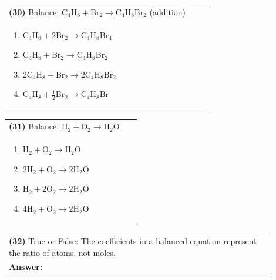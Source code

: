\documentclass{article}
\begin{document}
{\vspace{0.2cm}
\noindent \begin{tabular}{|p{0.9\linewidth}|}
\hline
\vspace{0.2cm}
\textbf{(30)} Balance: \(\mathrm{C_4H_8 + Br_2 \rightarrow C_4H_8Br_2}\) (addition)\\
\begin{minipage}[t]{0.85\linewidth}
\begin{enumerate}[label=\alph*.]
   \item \(\mathrm{C_4H_8 + 2Br_2 \rightarrow C_4H_8Br_4}\)
   \item \(\mathrm{C_4H_8 + Br_2 \rightarrow C_4H_8Br_2}\)
   \item \(\mathrm{2C_4H_8 + Br_2 \rightarrow 2C_4H_8Br_2}\)
   \item \(\mathrm{C_4H_8 + \tfrac{1}{2}Br_2 \rightarrow C_4H_8Br}\)
\end{enumerate}
\end{minipage}\\
\hline
\end{tabular}

\vspace{0.2cm}
\noindent \begin{tabular}{|p{0.9\linewidth}|}
\hline
\vspace{0.2cm}
\textbf{(31)} Balance: $\mathrm{H_2 + O_2 \rightarrow H_2O}$\\
\begin{minipage}[t]{0.85\linewidth}
\begin{enumerate}[label=\alph*.]
\item $\mathrm{H_2 + O_2 \rightarrow H_2O}$
\item $\mathrm{2H_2 + O_2 \rightarrow 2H_2O}$
\item $\mathrm{H_2 + 2O_2 \rightarrow 2H_2O}$
\item $\mathrm{4H_2 + O_2 \rightarrow 2H_2O}$
\end{enumerate}
\end{minipage}\\
\hline
\end{tabular}

\vspace{0.2cm}
\noindent \begin{tabular}{|p{0.9\linewidth}|}
\hline
\vspace{0.2cm}
\textbf{(32)} True or False: The coefficients in a balanced equation represent the ratio of atoms, not moles.\\
\textbf{Answer:} \underline{\hspace{2cm}}\\
\hline
\end{tabular}
\newpage

}
\end{document}
